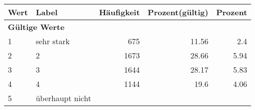      \begin{longtable}{lXrrr}
     \toprule
     \textbf{Wert} & \textbf{Label} & \textbf{Häufigkeit} & \textbf{Prozent(gültig)} & \textbf{Prozent} \\
     \endhead
     \midrule
     \multicolumn{5}{l}{\textbf{Gültige Werte}}\\

     1 &
     \multicolumn{1}{X}{ sehr stark   } &


       \num{675} &
       \num[round-mode=places,round-precision=2]{11.56} &
         \num[round-mode=places,round-precision=2]{2.4} \\

     2 &
     \multicolumn{1}{X}{ 2   } &


       \num{1673} &
       \num[round-mode=places,round-precision=2]{28.66} &
         \num[round-mode=places,round-precision=2]{5.94} \\

     3 &
     \multicolumn{1}{X}{ 3   } &


       \num{1644} &
       \num[round-mode=places,round-precision=2]{28.17} &
         \num[round-mode=places,round-precision=2]{5.83} \\

     4 &
     \multicolumn{1}{X}{ 4   } &


       \num{1144} &
       \num[round-mode=places,round-precision=2]{19.6} &
         \num[round-mode=places,round-precision=2]{4.06} \\

     5 &
     \multicolumn{1}{X}{ überhaupt nicht   } &



\end{longtable}
